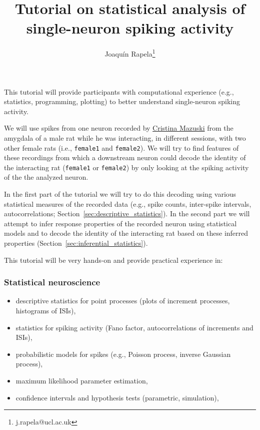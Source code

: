 \documentclass[10pt]{article}
\title{Tutorial on statistical analysis of single-neuron spiking activity}
\author{Joaqu\'{i}n Rapela\thanks{j.rapela@ucl.ac.uk}}
\begin{document}
\maketitle

This tutorial will provide participants with computational experience
(e.g., statistics, programming, plotting) to better understand single-neuron
spiking activity.

We will use spikes from one neuron recorded by \href{https://www.sainsburywellcome.org/web/people/cristina-mazuski}{Cristina Mazuski} from the
amygdala of a male rat while he was interacting, in different sessions,
with two other female rats (i.e., \texttt{female1} and \texttt{female2}). We will try to find
features of these recordings from which a downstream neuron could decode the
identity of the interacting rat (\texttt{female1} or \texttt{female2}) by only looking at the
spiking activity of the the analyzed neuron.

In the first part of the tutorial we will try to do this decoding using various
statistical measures of the recorded data (e.g., spike counts, inter-spike
intervals, autocorrelations; Section~\ref{sec:descriptive_statistics}). In the
second part we will attempt to infer response properties of the recorded neuron
using statistical models and to decode the identity of the interacting rat
based on these inferred properties (Section~\ref{sec:inferential_statistics}).

This tutorial will be very hands-on and provide practical experience in:

\subsubsection*{Statistical neuroscience}

        \begin{itemize}
            \item descriptive statistics for point processes (plots of increment processes, histograms of ISIs),
            \item statistics for spiking activity (Fano factor, autocorrelations of increments and ISIs),
            \item probabilistic models for spikes (e.g., Poisson process, inverse Gaussian process),
            \item maximum likelihood parameter estimation,
            \item confidence intervals and hypothesis tests (parametric, simulation),
        \end{itemize}
\end{document}
